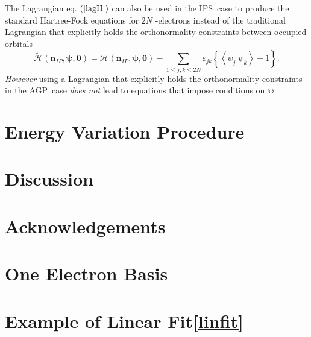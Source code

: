 \documentclass[aps,preprint]{revtex4}%
\begin{document}
The Lagrangian eq. $\left(  \ref{lagH}\right)  $ can also be used in the
IPS\ case to produce the standard Hartree-Fock equations for $2N$ -electrons
instead of the traditional Lagrangian that explicitly holds the orthonormality
constraints between occupied orbitals
\begin{equation}
\mathcal{\tilde{H}}\left(  \mathbf{n}_{IP}\mathbf{,\mathbf{\psi},0}\right)
=\mathcal{H}\left(  \mathbf{n}_{IP}\mathbf{,\mathbf{\psi},0}\right)
-\sum_{1\leq j,k\leq2N}\varepsilon_{jk}\left\{  \left\langle \left.  \psi
_{j}\right\vert \psi_{k}\right\rangle -1\right\}  . \label{tradlag}%
\end{equation}
\emph{However }using a Lagrangian that explicitly holds the orthonormality
constraints in the AGP\ case \emph{does not} lead to equations that impose
conditions on $\mathbf{\mathbf{\psi}}$.

\section{Energy Variation Procedure \label{procedure}}

\section{Discussion\label{Discussion}}

\section{Acknowledgements}

\appendix

\section{One Electron Basis\label{basis}}

\section{Example of Linear Fit\ref{linfit}}
\end{document}
